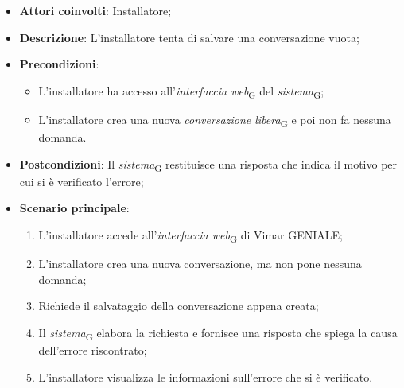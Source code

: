 \begin{itemize}
    \item \textbf{Attori coinvolti}: Installatore;
    \item \textbf{Descrizione}: L’installatore tenta di salvare una conversazione vuota;
    \item \textbf{Precondizioni}: 
    \begin{itemize}
        \item L’installatore ha accesso all’\textit{interfaccia web}\textsubscript{G} del \textit{sistema}\textsubscript{G};
        \item L'installatore crea una nuova \textit{conversazione libera}\textsubscript{G} e poi non fa nessuna domanda.
    \end{itemize}
    \item \textbf{Postcondizioni}: Il \textit{sistema}\textsubscript{G} restituisce una risposta che indica il motivo per cui si è verificato l’errore;
    \item \textbf{Scenario principale}:
    \begin{enumerate}
        \item L’installatore accede all’\textit{interfaccia web}\textsubscript{G} di Vimar GENIALE;
        \item L'installatore crea una nuova conversazione, ma non pone nessuna domanda;
        \item Richiede il salvataggio della conversazione appena creata;
        \item Il \textit{sistema}\textsubscript{G} elabora la richiesta e fornisce una risposta che spiega la causa dell'errore riscontrato;
        \item L’installatore visualizza le informazioni sull’errore che si è verificato.
    \end{enumerate}
\end{itemize}



